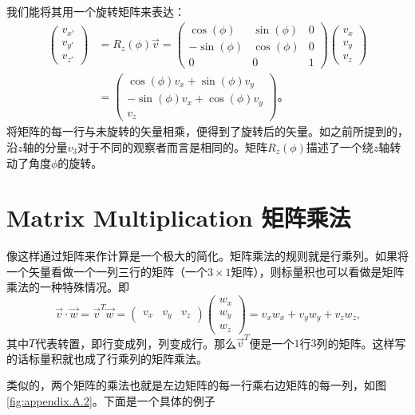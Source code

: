 我们能将其用一个旋转矩阵来表达：
\begin{equation}
\begin{aligned}
\begin{pmatrix}
v_{x'} \\ v_{y'} \\ v_{z'}
\end{pmatrix} &= R_z(\phi)\vec{v} =
\begin{pmatrix}
\cos(\phi) & \sin(\phi) & 0 \\
-\sin(\phi) & \cos(\phi) & 0 \\
0 & 0 & 1
\end{pmatrix}
\begin{pmatrix}
v_x \\ v_y \\ v_z
\end{pmatrix} \\
&= \begin{pmatrix}
\cos(\phi)v_x+\sin(\phi)v_y \\ -\sin(\phi)v_x+\cos(\phi)v_y \\ v_z
\end{pmatrix}\text{。}
\end{aligned}
\end{equation}
将矩阵的每一行与未旋转的矢量相乘，便得到了旋转后的矢量。如之前所提到的，沿$z$轴的分量$v_3$对于不同的观察者而言是相同的。矩阵$R_z(\phi)$描述了一个绕$z$轴转动了角度$\phi$的旋转。

\section[矩阵乘法]{Matrix Multiplication 矩阵乘法}\label{appendix.A.3}
像这样通过矩阵来作计算是一个极大的简化。矩阵乘法的规则就是行乘列。如果将一个矢量看做一个一列三行的矩阵（一个$3\times 1$矩阵），则标量积也可以看做是矩阵乘法的一种特殊情况。即
\begin{equation}
\vec{v}\cdot\vec{w} = \vec{v}^T\vec{w}= \begin{pmatrix}
v_x & v_y & v_z
\end{pmatrix} \begin{pmatrix}
w_x \\ w_y \\ w_z
\end{pmatrix} = v_xw_x +v_yw_y +v_zw_z\text{,}
\end{equation}
其中$T$代表转置，即行变成列，列变成行。那么$\vec{v}^T$便是一个$1$行$3$列的矩阵。这样写的话标量积就也成了行乘列的矩阵乘法。

类似的，两个矩阵的乘法也就是左边矩阵的每一行乘右边矩阵的每一列，如图\ref{fig:appendix.A.2}。下面是一个具体的例子

